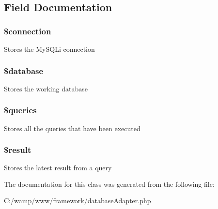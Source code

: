 \subsection{Field Documentation}
\hypertarget{class_my_s_q_li_database_a0d9c79b9b86b3f5891c6d3892f12c6a0}{
\subsubsection[{\$connection}]{\setlength{\rightskip}{0pt plus 5cm}\$connection}}
\label{class_my_s_q_li_database_a0d9c79b9b86b3f5891c6d3892f12c6a0}
Stores the MySQLi connection \hypertarget{class_my_s_q_li_database_a7691c0162d89de0b6ba47edcd8ba8878}{
\subsubsection[{\$database}]{\setlength{\rightskip}{0pt plus 5cm}\$database}}
\label{class_my_s_q_li_database_a7691c0162d89de0b6ba47edcd8ba8878}
Stores the working database \hypertarget{class_my_s_q_li_database_a576b05de2f452e4cce4e3de12667ba0f}{
\subsubsection[{\$queries}]{\setlength{\rightskip}{0pt plus 5cm}\$queries}}
\label{class_my_s_q_li_database_a576b05de2f452e4cce4e3de12667ba0f}
Stores all the queries that have been executed \hypertarget{class_my_s_q_li_database_a112ef069ddc0454086e3d1e6d8d55d07}{
\subsubsection[{\$result}]{\setlength{\rightskip}{0pt plus 5cm}\$result}}
\label{class_my_s_q_li_database_a112ef069ddc0454086e3d1e6d8d55d07}
Stores the latest result from a query 

The documentation for this class was generated from the following file:\begin{DoxyCompactItemize}
\item 
C:/wamp/www/framework/databaseAdapter.php\end{DoxyCompactItemize}
